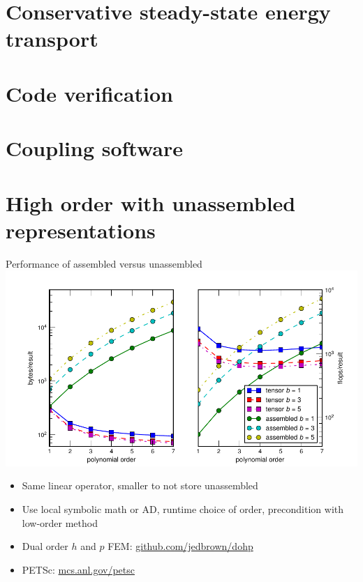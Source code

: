 \documentclass{beamer}
\begin{document}
\section{Conservative steady-state energy transport}






\section{Code verification}


\section{Coupling software}



\section{High order with unassembled representations}
\begin{frame}{Performance of assembled versus unassembled}
  \includegraphics[width=\textwidth]{figures/TensorVsAssembly} \\
  \begin{itemize}
  \item Same linear operator, smaller to not store unassembled
  \item Use local symbolic math or AD, runtime choice of order, precondition with low-order method
  \item Dual order $h$ and $p$ FEM: \url{github.com/jedbrown/dohp}
  \item PETSc: \url{mcs.anl.gov/petsc}
  \end{itemize}
\end{frame}
\end{document}
